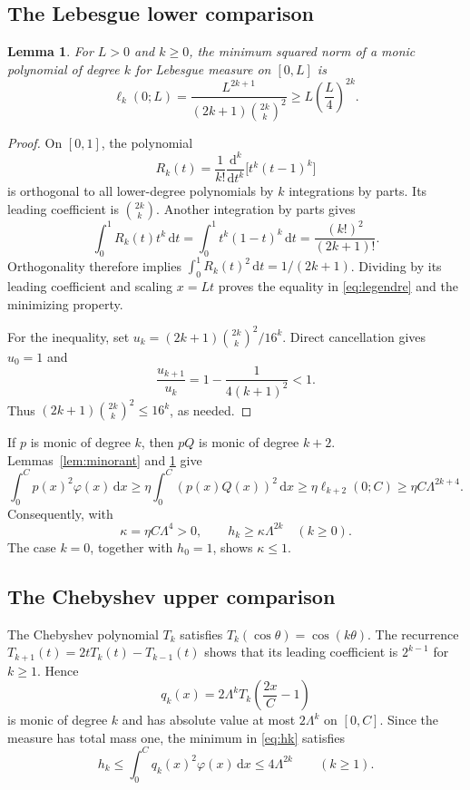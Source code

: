 \documentclass[11pt,a4paper]{article}
\numberwithin{equation}{section}
\newtheorem{lemma}[theorem]{Lemma}
\theoremstyle{remark}\newtheorem{remark}[theorem]{Remark}
\newcommand{\dd}{\,\mathrm d}
\begin{document}
\subsection{The Lebesgue lower comparison}
\begin{lemma}\label{lem:legendre}
For $L>0$ and $k\geq0$, the minimum squared norm of a monic polynomial of
degree $k$ for Lebesgue measure on $[0,L]$ is
\begin{equation}\label{eq:legendre}
 \ell_k(0;L)=\frac{L^{2k+1}}{(2k+1)\binom{2k}{k}^2}
 \geq L\left(\frac L4\right)^{2k}.
\end{equation}
\end{lemma}
\begin{proof}
On $[0,1]$, the polynomial
\[
 R_k(t)=\frac1{k!}\frac{\mathrm d^k}{\mathrm dt^k}
       \bigl[t^k(t-1)^k\bigr]
\]
is orthogonal to all lower-degree polynomials by $k$ integrations by parts.
Its leading coefficient is $\binom{2k}{k}$. Another integration by parts gives
\[
 \int_0^1 R_k(t)t^k\dd t
 =\int_0^1 t^k(1-t)^k\dd t
 =\frac{(k!)^2}{(2k+1)!}.
\]
Orthogonality therefore implies $\int_0^1R_k(t)^2\dd t=1/(2k+1)$.
Dividing by its leading coefficient and scaling $x=Lt$ proves the equality
in \eqref{eq:legendre} and the minimizing property.

For the inequality, set $u_k=(2k+1)\binom{2k}{k}^2/16^k$. Direct cancellation
gives $u_0=1$ and
\[
 \frac{u_{k+1}}{u_k}=1-\frac1{4(k+1)^2}<1.
\]
Thus $(2k+1)\binom{2k}{k}^2\leq16^k$, as needed.
\end{proof}

If $p$ is monic of degree $k$, then $pQ$ is monic of degree $k+2$.
Lemmas~\ref{lem:minorant} and \ref{lem:legendre} give
\[
 \int_0^C p(x)^2\varphi(x)\dd x
 \geq\eta\int_0^C(p(x)Q(x))^2\dd x
 \geq\eta\ell_{k+2}(0;C)
 \geq\eta C\Lambda^{2k+4}.
\]
Consequently, with
\begin{equation}\label{eq:kappa}
 \kappa=\eta C\Lambda^4>0,
 \qquad h_k\geq\kappa\Lambda^{2k}\quad(k\geq0).
\end{equation}
The case $k=0$, together with $h_0=1$, shows $\kappa\leq1$.

\subsection{The Chebyshev upper comparison}
The Chebyshev polynomial $T_k$ satisfies $T_k(\cos\theta)=\cos(k\theta)$.
The recurrence $T_{k+1}(t)=2tT_k(t)-T_{k-1}(t)$ shows that its leading
coefficient is $2^{k-1}$ for $k\geq1$. Hence
\[
 q_k(x)=2\Lambda^k T_k\left(\frac{2x}{C}-1\right)
\]
is monic of degree $k$ and has absolute value at most $2\Lambda^k$ on $[0,C]$.
Since the measure has total mass one, the minimum in \eqref{eq:hk} satisfies
\begin{equation}\label{eq:uppernorm}
 h_k\leq\int_0^Cq_k(x)^2\varphi(x)\dd x\leq4\Lambda^{2k}
 \qquad(k\geq1).
\end{equation}
\end{document}
